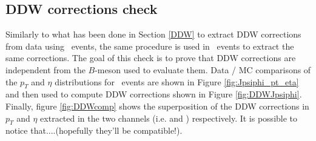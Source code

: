 
\subsection{DDW corrections check}
 
Similarly to what has been done in Section \ref{DDW} to extract DDW corrections from data using \BpmKpmJpsi\ events, the same procedure is used in  \BsJpsiPhi\ events to extract the same corrections. The goal of this check is to prove that DDW corrections are independent from the $B$-meson used to evaluate them. Data / MC comparisons of the $p_T$ and $\eta$ distributions for \BsJpsiPhi\ events are shown in Figure \ref{fig:Jpsiphi_pt_eta} and then used to compute DDW corrections shown in Figure \ref{fig:DDWJpsiphi}. Finally, figure \ref{fig:DDWcomp} shows the superposition of the DDW corrections in $p_T$ and $\eta$ extracted in the two channels (i.e. \BpmKpmJpsi and \BsJpsiPhi) respectively. It is possible to notice that....(hopefully they'll be compatible!).
